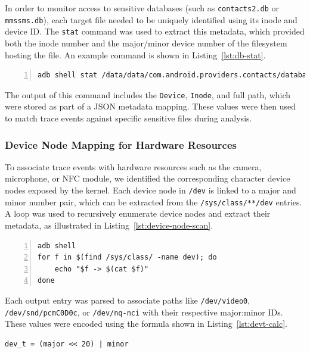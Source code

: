 \documentclass[a4paper,12pt]{report}
\begin{document}
In order to monitor access to sensitive databases (such as \texttt{contacts2.db} or \texttt{mmssms.db}), each target file needed to be uniquely identified using its inode and device ID. The \texttt{stat} command was used to extract this metadata, which provided both the inode number and the major/minor device number of the filesystem hosting the file. An example command is shown in Listing~\ref{lst:db-stat}.

\begin{lstlisting}[language=sh,caption={Retrieving inode and device ID for a database file},label={lst:db-stat},numbers=left]
adb shell stat /data/data/com.android.providers.contacts/databases/contacts2.db
\end{lstlisting}

The output of this command includes the \texttt{Device}, \texttt{Inode}, and full path, which were stored as part of a JSON metadata mapping. These values were then used to match trace events against specific sensitive files during analysis.

\subsubsection{Device Node Mapping for Hardware Resources}

To associate trace events with hardware resources such as the camera, microphone, or NFC module, we identified the corresponding character device nodes exposed by the kernel. Each device node in \texttt{/dev} is linked to a major and minor number pair, which can be extracted from the \texttt{/sys/class/**/dev} entries. A loop was used to recursively enumerate device nodes and extract their metadata, as illustrated in Listing~\ref{lst:device-node-scan}.

\begin{lstlisting}[caption={Enumerating character and block devices with major:minor IDs},label={lst:device-node-scan},numbers=left]
adb shell
for f in $(find /sys/class/ -name dev); do
    echo "$f -> $(cat $f)"
done
\end{lstlisting}

Each output entry was parsed to associate paths like \texttt{/dev/video0}, \texttt{/dev/snd/pcmC0D0c}, or \texttt{/dev/nq-nci} with their respective major:minor IDs. These values were encoded using the formula shown in Listing~\ref{lst:devt-calc}.

\begin{lstlisting}[caption={Encoding device number using major and minor},label={lst:devt-calc},numbers=none]
dev_t = (major << 20) | minor
\end{lstlisting}
\end{document}
